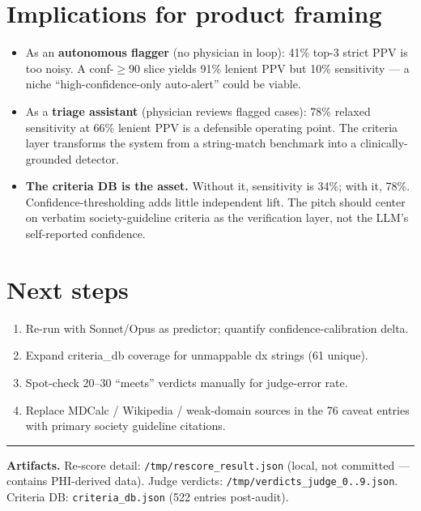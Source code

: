\documentclass[11pt]{article}
\begin{document}
\section{Implications for product framing}
\begin{itemize}[leftmargin=*,nosep]
\item As an \textbf{autonomous flagger} (no physician in loop): 41\% top-3 strict PPV
    is too noisy. A conf-$\geq 90$ slice yields 91\% lenient PPV but 10\% sensitivity ---
    a niche ``high-confidence-only auto-alert'' could be viable.
\item As a \textbf{triage assistant} (physician reviews flagged cases): 78\% relaxed
    sensitivity at 66\% lenient PPV is a defensible operating point. The criteria layer
    transforms the system from a string-match benchmark into a clinically-grounded
    detector.
\item \textbf{The criteria DB is the asset.} Without it, sensitivity is 34\%; with it, 78\%.
    Confidence-thresholding adds little independent lift. The pitch should center on
    verbatim society-guideline criteria as the verification layer, not the LLM's self-reported
    confidence.
\end{itemize}

\section{Next steps}
\begin{enumerate}[leftmargin=*,nosep]
\item Re-run with Sonnet/Opus as predictor; quantify confidence-calibration delta.
\item Expand criteria\_db coverage for unmappable dx strings (61 unique).
\item Spot-check 20--30 ``meets'' verdicts manually for judge-error rate.
\item Replace MDCalc / Wikipedia / weak-domain sources in the 76 caveat entries with
    primary society guideline citations.
\end{enumerate}

\vspace{1em}
\hrule
\vspace{0.5em}
\small
\noindent\textbf{Artifacts.} Re-score detail: \texttt{/tmp/rescore\_result.json} (local,
not committed --- contains PHI-derived data). Judge verdicts: \texttt{/tmp/verdicts\_judge\_0..9.json}.
Criteria DB: \texttt{criteria\_db.json} (522 entries post-audit).
\end{document}
